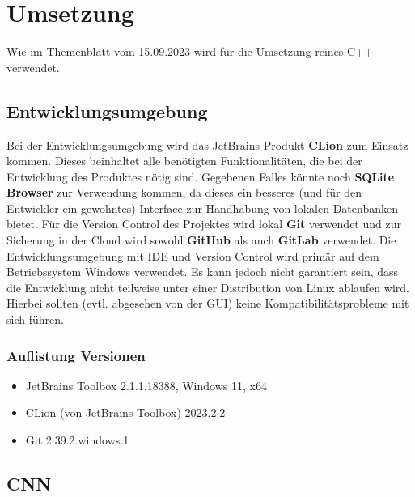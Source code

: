 \section{Umsetzung}
\label{sec:AnalyseUmsetzung}
Wie im Themenblatt vom 15.09.2023 wird für die Umsetzung reines C++ verwendet.

\subsection{Entwicklungsumgebung}
\label{sec:AnalyseEntwicklungsumgebung}
Bei der Entwicklungsumgebung wird das JetBrains Produkt \textbf{CLion} zum Einsatz kommen. Dieses beinhaltet alle benötigten Funktionalitäten, die bei der Entwicklung des Produktes nötig sind. Gegebenen Falles könnte noch \textbf{SQLite Browser} zur Verwendung kommen, da dieses ein besseres (und für den Entwickler ein gewohntes) Interface zur Handhabung von lokalen Datenbanken bietet. Für die Version Control des Projektes wird lokal \textbf{Git} verwendet und zur Sicherung in der Cloud wird sowohl \textbf{GitHub} als auch \textbf{GitLab} verwendet. Die Entwicklungsumgebung mit IDE und Version Control wird primär auf dem Betriebssystem Windows verwendet. Es kann jedoch nicht garantiert sein, dass die Entwicklung nicht teilweise unter einer Distribution von Linux ablaufen wird. Hierbei sollten (evtl. abgesehen von der GUI) keine Kompatibilitätsprobleme mit sich führen. 
\subsubsection{Auflistung Versionen}
\label{sec:AnalyseDevEnvAuflistung}
\begin{itemize}
\item JetBrains Toolbox 2.1.1.18388, Windows 11, x64
\item CLion (von JetBrains Toolbox) 2023.2.2
\item Git 2.39.2.windows.1
\end{itemize}

\subsection{CNN}
\label{sec:AnalyseCNN}
